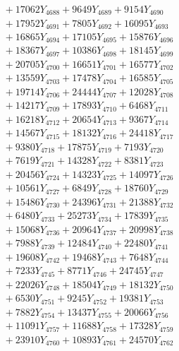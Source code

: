 \documentclass[a4paper,10pt]{article}
\begin{document}
{\begin{align}
&\;  + 17062 Y_{4688} + 9649 Y_{4689} + 9154 Y_{4690} \\[0.3ex]
&\;  + 17952 Y_{4691} + 7805 Y_{4692} + 16095 Y_{4693} \\[0.3ex]
&\;  + 16865 Y_{4694} + 17105 Y_{4695} + 15876 Y_{4696} \\[0.3ex]
&\;  + 18367 Y_{4697} + 10386 Y_{4698} + 18145 Y_{4699} \\[0.3ex]
&\;  + 20705 Y_{4700} + 16651 Y_{4701} + 16577 Y_{4702} \\[0.3ex]
&\;  + 13559 Y_{4703} + 17478 Y_{4704} + 16585 Y_{4705} \\[0.3ex]
&\;  + 19714 Y_{4706} + 24444 Y_{4707} + 12028 Y_{4708} \\[0.5ex]\allowbreak
&\;  + 14217 Y_{4709} + 17893 Y_{4710} + 6468 Y_{4711} \\[0.3ex]
&\;  + 16218 Y_{4712} + 20654 Y_{4713} + 9367 Y_{4714} \\[0.3ex]
&\;  + 14567 Y_{4715} + 18132 Y_{4716} + 24418 Y_{4717} \\[0.3ex]
&\;  + 9380 Y_{4718} + 17875 Y_{4719} + 7193 Y_{4720} \\[0.3ex]
&\;  + 7619 Y_{4721} + 14328 Y_{4722} + 8381 Y_{4723} \\[0.3ex]
&\;  + 20456 Y_{4724} + 14323 Y_{4725} + 14097 Y_{4726} \\[0.3ex]
&\;  + 10561 Y_{4727} + 6849 Y_{4728} + 18760 Y_{4729} \\[0.3ex]
&\;  + 15486 Y_{4730} + 24396 Y_{4731} + 21388 Y_{4732} \\[0.3ex]
&\;  + 6480 Y_{4733} + 25273 Y_{4734} + 17839 Y_{4735} \\[0.3ex]
&\;  + 15068 Y_{4736} + 20964 Y_{4737} + 20998 Y_{4738} \\[0.5ex]\allowbreak
&\;  + 7988 Y_{4739} + 12484 Y_{4740} + 22480 Y_{4741} \\[0.3ex]
&\;  + 19608 Y_{4742} + 19468 Y_{4743} + 7648 Y_{4744} \\[0.3ex]
&\;  + 7233 Y_{4745} + 8771 Y_{4746} + 24745 Y_{4747} \\[0.3ex]
&\;  + 22026 Y_{4748} + 18504 Y_{4749} + 18132 Y_{4750} \\[0.3ex]
&\;  + 6530 Y_{4751} + 9245 Y_{4752} + 19381 Y_{4753} \\[0.3ex]
&\;  + 7882 Y_{4754} + 13437 Y_{4755} + 20066 Y_{4756} \\[0.3ex]
&\;  + 11091 Y_{4757} + 11688 Y_{4758} + 17328 Y_{4759} \\[0.3ex]
&\;  + 23910 Y_{4760} + 10893 Y_{4761} + 24570 Y_{4762} \\[0.3ex]

\end{align}}
\end{document}
